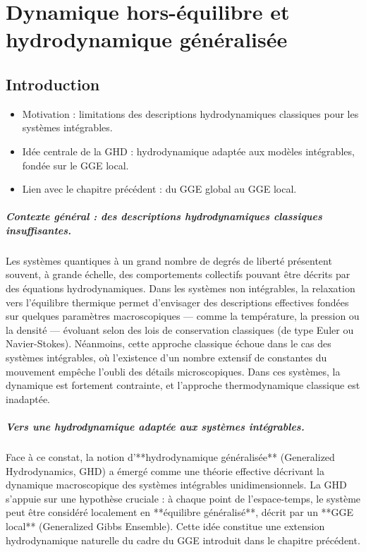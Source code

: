 \chapter{Dynamique hors-équilibre et hydrodynamique généralisée}
\label{chap:GHD}
\minitoc


\section*{Introduction}

{\color{blue}
\begin{itemize}
    \item Motivation : limitations des descriptions hydrodynamiques classiques pour les systèmes intégrables.
    \item Idée centrale de la GHD : hydrodynamique adaptée aux modèles intégrables, fondée sur le GGE local.
    \item Lien avec le chapitre précédent : du GGE global au GGE local.
\end{itemize}
}

\paragraph{Contexte général : des descriptions hydrodynamiques classiques insuffisantes.}
Les systèmes quantiques à un grand nombre de degrés de liberté présentent souvent, à grande échelle, des comportements collectifs pouvant être décrits par des équations hydrodynamiques. Dans les systèmes non intégrables, la relaxation vers l’équilibre thermique permet d’envisager des descriptions effectives fondées sur quelques paramètres macroscopiques — comme la température, la pression ou la densité — évoluant selon des lois de conservation classiques (de type Euler ou Navier-Stokes). Néanmoins, cette approche classique échoue dans le cas des systèmes intégrables, où l’existence d’un nombre extensif de constantes du mouvement empêche l’oubli des détails microscopiques. Dans ces systèmes, la dynamique est fortement contrainte, et l’approche thermodynamique classique est inadaptée.

\paragraph{Vers une hydrodynamique adaptée aux systèmes intégrables.}
Face à ce constat, la notion d’**hydrodynamique généralisée** (Generalized Hydrodynamics, GHD) a émergé comme une théorie effective décrivant la dynamique macroscopique des systèmes intégrables unidimensionnels. La GHD s’appuie sur une hypothèse cruciale : à chaque point de l’espace-temps, le système peut être considéré localement en **équilibre généralisé**, décrit par un **GGE local** (Generalized Gibbs Ensemble). Cette idée constitue une extension hydrodynamique naturelle du cadre du GGE introduit dans le chapitre précédent.

